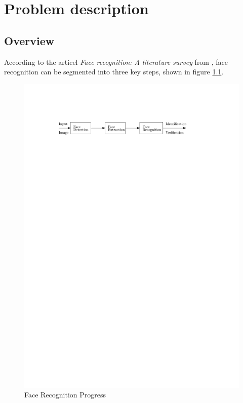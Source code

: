 \documentclass[Bachelorarbeit.tex]{subfiles}
\begin{document}
\chapter{Problem description}\label{ProblemDescription}
\section{Overview}
According to the articel  \textit{Face recognition: A literature survey} from \cite{FRLiteratureSurvey}, face recognition can be segmented into three key steps, shown in figure \ref{FRP}.\\

\begin{figure}[!h]
\centering
\includegraphics[page=2,width=14cm]{./pictures/drawings_2}
\caption{Face Recognition Progress \label{FRP}}
\end{figure}
\end{document}
